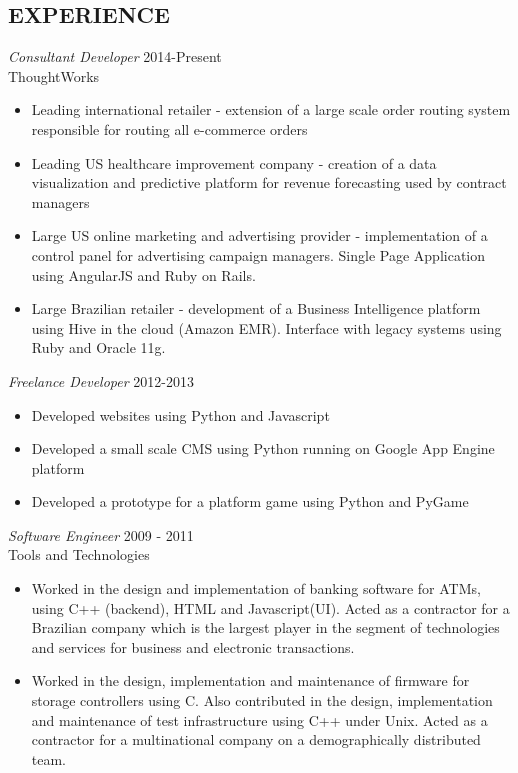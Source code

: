 \documentclass[line,margin]{res}
\begin{document}
\begin{resume}
\section{EXPERIENCE} {\sl Consultant Developer} \hfill 2014-Present\\
		ThoughtWorks
		\begin{itemize}
      \item Leading international retailer - extension of a large scale order routing system responsible for routing all e-commerce orders
      \item Leading US healthcare improvement company - creation of a data visualization and predictive platform for revenue forecasting used by contract managers
      \item Large US online marketing and advertising provider - implementation of a control panel for advertising campaign managers. Single Page Application using 
        AngularJS and Ruby on Rails.
      \item Large Brazilian retailer - development of a Business Intelligence platform using Hive in the cloud (Amazon EMR). Interface with legacy systems 
        using Ruby and Oracle 11g.
		\end{itemize} 
                {\sl Freelance Developer} \hfill 2012-2013
                 \begin{itemize}  \itemsep -2pt %
                 \item Developed websites using Python and Javascript
                \item Developed a small scale CMS using Python running on Google App Engine platform
                \item Developed a prototype for a platform game using Python and PyGame
                \end{itemize}
 
                {\sl Software Engineer} \hfill            2009 - 2011\\
                Tools and Technologies 
                 \begin{itemize}  \itemsep -2pt %
                 \item Worked in the design and implementation of banking software for ATMs, using C++ (backend),
                       HTML and Javascript(UI). Acted as a contractor for a Brazilian company which is the largest player
                       in the segment of technologies and services for business and electronic transactions.
                 \item Worked in the design, implementation and maintenance of firmware for storage controllers using C. 
                       Also contributed in the design, implementation and maintenance of test infrastructure 
                       using C++ under Unix. Acted as a contractor for a multinational company on a demographically distributed team.
                 \end{itemize} 


\end{resume}
\end{document}
